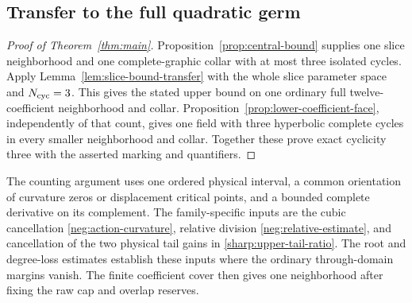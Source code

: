 \subsection{Transfer to the full quadratic germ}

\begin{proof}[Proof of Theorem~\ref{thm:main}]
Proposition~\ref{prop:central-bound} supplies one slice neighborhood
and one complete-graphic collar with at most three isolated cycles.
Apply Lemma~\ref{lem:slice-bound-transfer} with the whole slice
parameter space and $N_{\rm cyc}=3$. This gives the stated upper
bound on one ordinary full twelve-coefficient neighborhood and collar.
Proposition~\ref{prop:lower-coefficient-face}, independently of that
count, gives one field with three hyperbolic complete cycles in every
smaller neighborhood and collar. Together these prove exact cyclicity
three with the asserted marking and quantifiers.
\end{proof}

The counting argument uses one ordered physical interval, a common
orientation of curvature zeros or displacement critical points, and a
bounded complete derivative on its complement. The family-specific
inputs are the cubic cancellation \eqref{neg:action-curvature},
relative division \eqref{neg:relative-estimate}, and cancellation of
the two physical tail gains in \eqref{sharp:upper-tail-ratio}.
The root and degree-loss estimates establish these inputs where the
ordinary through-domain margins vanish. The finite coefficient cover
then gives one neighborhood after fixing the raw cap and overlap reserves.

